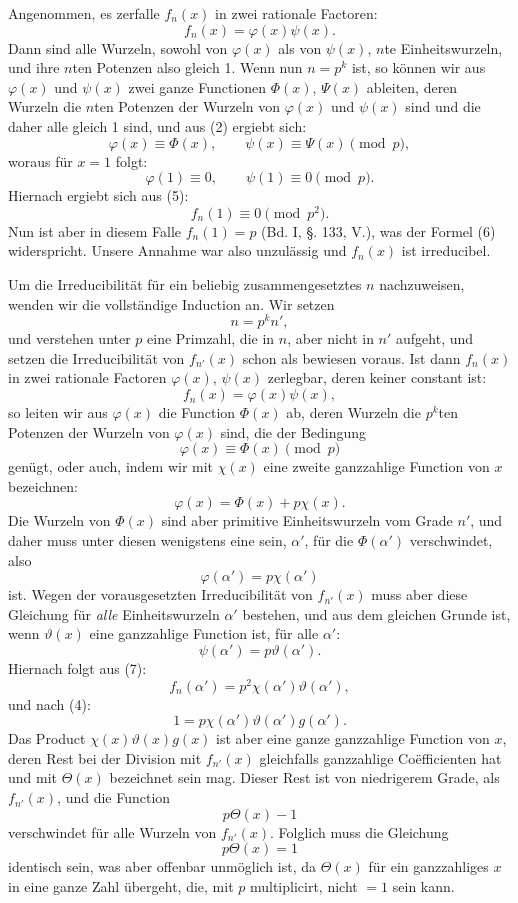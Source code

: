 \documentclass[11pt]{article}
\begin{document}
Angenommen, es zerfalle $f_n(x)$ in zwei rationale Factoren:
\begin{equation}\tag{5}
f_n(x)=\varphi(x)\psi(x).
\end{equation}
Dann sind alle Wurzeln, sowohl von $\varphi(x)$ als von $\psi(x)$, $n$te Einheitswurzeln, und ihre $n$ten Potenzen also gleich 1. Wenn nun $n=p^k$ ist, so können wir aus $\varphi(x)$ und $\psi(x)$ zwei ganze Functionen $\Phi(x)$, $\Psi(x)$ ableiten, deren Wurzeln die $n$ten Potenzen der Wurzeln von $\varphi(x)$ und $\psi(x)$ sind und die daher alle gleich 1 sind, und aus (2) ergiebt sich:
\[
\varphi(x)\equiv\Phi(x),\qquad \psi(x)\equiv\Psi(x) \pmod p,
\]
woraus für $x=1$ folgt:
\[
\varphi(1)\equiv0,
\qquad
\psi(1)\equiv0 \pmod p.
\]
Hiernach ergiebt sich aus (5):
\begin{equation}\tag{6}
f_n(1)\equiv0 \pmod {p^2}.
\end{equation}
Nun ist aber in diesem Falle $f_n(1)=p$ (Bd. I, §. 133, V.), was der Formel (6) widerspricht. Unsere Annahme war also unzulässig und $f_n(x)$ ist irreducibel.

Um die Irreducibilität für ein beliebig zusammengesetztes $n$ nachzuweisen, wenden wir die vollständige Induction an. Wir setzen
\[
n=p^k n',
\]
und verstehen unter $p$ eine Primzahl, die in $n$, aber nicht in $n'$ aufgeht, und setzen die Irreducibilität von $f_{n'}(x)$ schon als bewiesen voraus. Ist dann $f_n(x)$ in zwei rationale Factoren $\varphi(x)$, $\psi(x)$ zerlegbar, deren keiner constant ist:
\begin{equation}\tag{7}
f_n(x)=\varphi(x)\psi(x),
\end{equation}
so leiten wir aus $\varphi(x)$ die Function $\Phi(x)$ ab, deren Wurzeln die $p^k$ten Potenzen der Wurzeln von $\varphi(x)$ sind, die der Bedingung
\[
\varphi(x)\equiv\Phi(x) \pmod p
\]
genügt, oder auch, indem wir mit $\chi(x)$ eine zweite ganzzahlige Function von $x$ bezeichnen:
\[
\varphi(x)=\Phi(x)+p\chi(x).
\]
Die Wurzeln von $\Phi(x)$ sind aber primitive Einheitswurzeln vom Grade $n'$, und daher muss unter diesen wenigstens eine sein, $\alpha'$, für die $\Phi(\alpha')$ verschwindet, also
\[
\varphi(\alpha')=p\chi(\alpha')
\]
ist. Wegen der vorausgesetzten Irreducibilität von $f_{n'}(x)$ muss aber diese Gleichung für \emph{alle} Einheitswurzeln $\alpha'$ bestehen, und aus dem gleichen Grunde ist, wenn $\vartheta(x)$ eine ganzzahlige Function ist, für alle $\alpha'$:
\[
\psi(\alpha')=p\vartheta(\alpha').
\]
Hiernach folgt aus (7):
\[
f_n(\alpha')=p^2\chi(\alpha')\vartheta(\alpha'),
\]
und nach (4):
\[
1=p\chi(\alpha')\vartheta(\alpha')g(\alpha').
\]
Das Product $\chi(x)\vartheta(x)g(x)$ ist aber eine ganze ganzzahlige Function von $x$, deren Rest bei der Division mit $f_{n'}(x)$ gleichfalls ganzzahlige Coëfficienten hat und mit $\Theta(x)$ bezeichnet sein mag. Dieser Rest ist von niedrigerem Grade, als $f_{n'}(x)$, und die Function
\[
p\Theta(x)-1
\]
verschwindet für alle Wurzeln von $f_{n'}(x)$. Folglich muss die Gleichung
\[
p\Theta(x)=1
\]
identisch sein, was aber offenbar unmöglich ist, da $\Theta(x)$ für ein
ganzzahliges $x$ in eine ganze Zahl übergeht, die, mit $p$ multiplicirt, nicht $=1$ sein kann.
\end{document}
